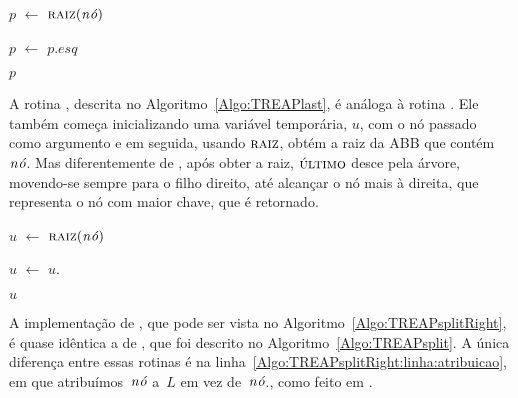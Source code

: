 \begin{algorithm}
\caption{\treapFirst($\node$)}
\label{Algo:TREAPfirst}
\begin{algorithmic}[1]
\State $p$ $\gets$ $\treapGetRoot(\node)$

  \State $p$ $\gets$ $p$.$esq$
\EndWhile

\State\Return $p$
\end{algorithmic}
\end{algorithm}

A rotina \treapLast{}, descrita no Algoritmo~\ref{Algo:TREAPlast}, é análoga à rotina \treapFirst{}.
Ele também começa inicializando uma variável temporária, $u$, com o nó passado como argumento e em seguida, usando $\treapGetRoot$, obtém a raiz da ABB que contém $\node$.
Mas diferentemente de \treapFirst{}, após obter a raiz, $\treapLast$ desce pela árvore, movendo-se sempre para o filho direito, até alcançar o nó mais à direita, que representa o nó com maior chave, que é retornado.

\begin{algorithm}
\caption{\treapLast($\node$)}
\label{Algo:TREAPlast}
\begin{algorithmic}[1]
\State $u$ $\gets$ $\treapGetRoot(\node)$

  \State $u$ $\gets$ $u$.
\EndWhile

\State\Return $u$
\end{algorithmic}
\end{algorithm}

A implementação de \treapSplitRight{}, que pode ser vista no Algoritmo~\ref{Algo:TREAPsplitRight}, é quase idêntica a de \treapSplit{}, que foi descrito no Algoritmo~\ref{Algo:TREAPsplit}.
A única diferença entre essas rotinas é na linha~\ref{Algo:TREAPsplitRight:linha:atribuicao}, em que atribuímos~$\node$ a~$L$ em vez de~$\node$., como feito em \treapSplit{}.

